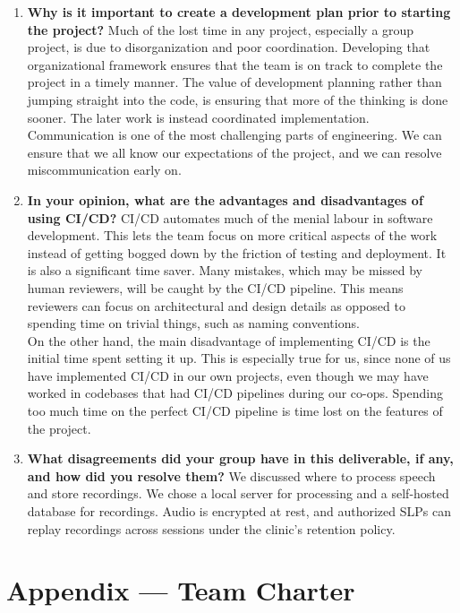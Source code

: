 \documentclass{article}
\begin{document}
\begin{enumerate}
    \item \textbf{Why is it important to create a development plan prior to starting the
    project?}
    Much of the lost time in any project, especially a group project, is due to disorganization and poor coordination.
    Developing that organizational framework ensures that the team is on track to complete the project in a timely manner.
    The value of development planning rather than jumping straight into the code, is ensuring that more of the thinking is done sooner.
    The later work is instead coordinated implementation. Communication is one of the most challenging parts of engineering.
    We can ensure that we all know our expectations of the project, and we can resolve miscommunication early on.
    \item \textbf{In your opinion, what are the advantages and disadvantages of using
    CI/CD?}
    CI/CD automates much of the menial labour in software development.
    This lets the team focus on more critical aspects of the work instead of getting bogged down by the friction of testing and deployment.
    It is also a significant time saver.
    Many mistakes, which may be missed by human reviewers, will be caught by the CI/CD pipeline.
    This means reviewers can focus on architectural and design details as opposed to spending time on trivial things, such as naming conventions. \\
    On the other hand, the main disadvantage of implementing CI/CD is the initial time spent setting it up.
    This is especially true for us, since none of us have implemented CI/CD in our own projects, even though we may have worked in codebases that had CI/CD pipelines during our co-ops.
    Spending too much time on the perfect CI/CD pipeline is time lost on the features of the project. 
    \item \textbf{What disagreements did your group have in this deliverable, if any,
    and how did you resolve them?}
    We discussed where to process speech and store recordings. We chose
    a local server for processing and a self-hosted database for
    recordings. Audio is encrypted at rest, and authorized SLPs can replay
    recordings across sessions under the clinic's retention policy.
\end{enumerate}

\newpage{}

\section*{Appendix --- Team Charter}
\end{document}
